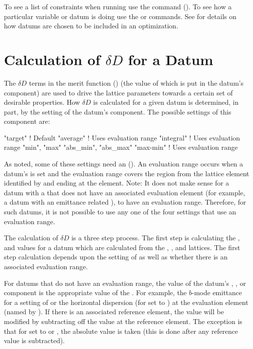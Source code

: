 To see a list of constraints when running \tao use the  command
(). To see how a particular variable or datum is doing use the  or
 commands.  See  for details on how datums are chosen to be
included in an optimization.

\section{Calculation of $\delta D$ for a Datum}
\label{s:del.d}

The $\delta D$ terms in the merit function () (the value of which is put in the datum's
 component) are used to drive the  lattice parameters towards a certain
set of desirable properties. How $\delta D$ is calculated for a given datum is determined, in part,
by the setting of the datum's  component. The possible settings of this component
are:
\begin{example}
  "target"                       ! Default
  "average"                      ! Uses evaluation range
  "integral"                     ! Uses evaluation range
  "min", "max"
  "abs_min", "abs_max"
  "max-min"                      ! Uses evaluation range
\end{example}
As noted, some of these settings need an  (). An evaluation
range occurs when a datum's  is set and the evaluation range covers the region
from the lattice element identified by  and ending at the  element.
Note: It does not make sense for a datum with a  that does not have an associated
evaluation element (for example, a datum with an emittance related ), to have an
evaluation range. Therefore, for such datums, it is not possible to use any one of the four
 settings that use an evaluation range.

The calculation of $\delta D$ is a three step process. The first step is calculating the
,  and  values for a datum which are calculated from the ,
, and  lattices. The first step calculation depends upon the setting of
 as well as whether there is an associated evaluation range.

For datums that do not have an evaluation range, the value of the datum's , , or
 component is the appropriate value of the . For example, the $b$-mode
emittance for a  setting of  or the horizontal dispersion (for
 set to ) at the evaluation element (named by ). If there is
an associated reference element, the value will be modified by subtracting off the 
value at the reference element. The exception is that for  set to  or
, the absolute value is taken (this is done after any reference value is subtracted).

